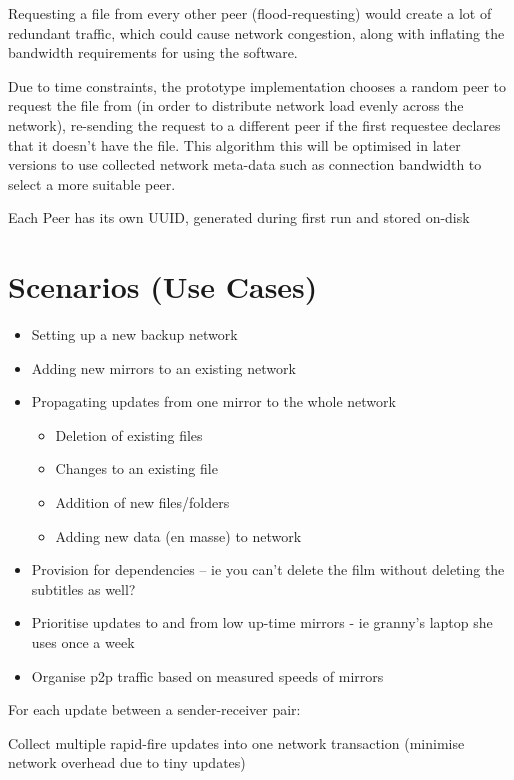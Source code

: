 \documentclass[12pt,a4paper,]{adreport}
\begin{document}
Requesting a file from every other peer (flood-requesting) would create
a lot of redundant traffic, which could cause network congestion, along
with inflating the bandwidth requirements for using the software.

Due to time constraints, the prototype implementation chooses a random
peer to request the file from (in order to distribute network load
evenly across the network), re-sending the request to a different peer
if the first requestee declares that it doesn't have the file. This
algorithm this will be optimised in later versions to use collected
network meta-data such as connection bandwidth to select a more suitable
peer.

Each Peer has its own UUID, generated during first run and stored
on-disk

\section{Scenarios (Use Cases)}\label{scenarios-use-cases}

\begin{itemize}
\itemsep1pt\parskip0pt
\item
  Setting up a new backup network
\item
  Adding new mirrors to an existing network
\item
  Propagating updates from one mirror to the whole network

  \begin{itemize}
  \itemsep1pt\parskip0pt
  \item
    Deletion of existing files
  \item
    Changes to an existing file
  \item
    Addition of new files/folders
  \item
    Adding new data (en masse) to network
  \end{itemize}
\item
  Provision for dependencies -- ie you can't delete the film without
  deleting the subtitles as well?
\item
  Prioritise updates to and from low up-time mirrors - ie granny's
  laptop she uses once a week
\item
  Organise p2p traffic based on measured speeds of mirrors
\end{itemize}

For each update between a sender-receiver pair:

Collect multiple rapid-fire updates into one network transaction
(minimise network overhead due to tiny updates)
\end{document}
